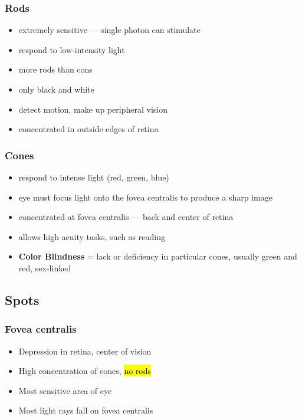 \documentclass[a4paper,12pt]{article}
\begin{document}
\subsubsection{Rods}
\begin{itemize}
    \item{extremely sensitive --- single photon can stimulate}
    \item{respond to low-intensity light}
    \item{more rods than cons}
    \item{only black and white}
    \item{detect motion, make up peripheral vision}
    \item{concentrated in outside edges of retina}
\end{itemize}

\subsubsection{Cones}
\begin{itemize}
    \item{respond to intense light (red, green, blue)}
    \item{eye must focus light onto the fovea centralis to produce a sharp image}
    \item{concentrated at fovea centralis --- back and center of retina}
    \item{allows high acuity tasks, such as reading}
    \item{\textbf{Color Blindness} = lack or deficiency in particular cones, usually green and red, sex-linked}
\end{itemize}

\subsection{Spots}
\subsubsection{Fovea centralis}
\begin{itemize}
    \item{Depression in retina, center of vision}
    \item{High concentration of cones, \hl{no rods}}
    \item{Most sensitive area of eye}
    \item{Most light rays fall on fovea centralis}
\end{itemize}
\end{document}
